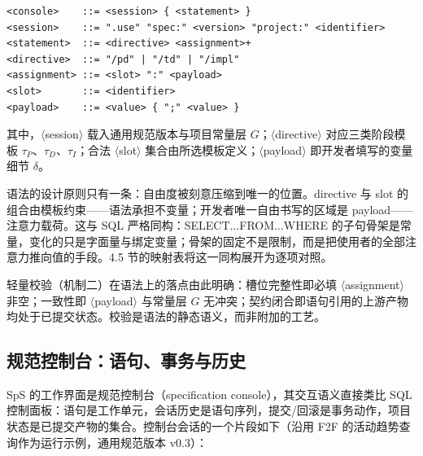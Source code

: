 \documentclass[11pt,a4paper]{ctexart}
\begin{document}
\begin{table}[htbp]
\centering
\caption{规范语句的参考语法（EBNF，非规范性）}
\label{tab:grammar}
\begin{verbatim}
<console>    ::= <session> { <statement> }
<session>    ::= ".use" "spec:" <version> "project:" <identifier>
<statement>  ::= <directive> <assignment>+
<directive>  ::= "/pd" | "/td" | "/impl"
<assignment> ::= <slot> ":" <payload>
<slot>       ::= <identifier>
<payload>    ::= <value> { ";" <value> }
\end{verbatim}
\end{table}

其中，$\langle$session$\rangle$ 载入通用规范版本与项目常量层 $G$；$\langle$directive$\rangle$ 对应三类阶段模板 $\tau_P$、$\tau_D$、$\tau_I$；合法 $\langle$slot$\rangle$ 集合由所选模板定义；$\langle$payload$\rangle$ 即开发者填写的变量细节 $\delta$。

语法的设计原则只有一条：自由度被刻意压缩到唯一的位置。directive 与 slot 的组合由模板约束——语法承担不变量；开发者唯一自由书写的区域是 payload——注意力载荷。这与 SQL 严格同构：SELECT$\ldots$FROM$\ldots$WHERE 的子句骨架是常量，变化的只是字面量与绑定变量；骨架的固定不是限制，而是把使用者的全部注意力推向值的手段。4.5 节的映射表将这一同构展开为逐项对照。

轻量校验（机制二）在语法上的落点由此明确：槽位完整性即必填 $\langle$assignment$\rangle$ 非空；一致性即 $\langle$payload$\rangle$ 与常量层 $G$ 无冲突；契约闭合即语句引用的上游产物均处于已提交状态。校验是语法的静态语义，而非附加的工艺。

\subsection{规范控制台：语句、事务与历史}
SpS 的工作界面是规范控制台（specification console），其交互语义直接类比 SQL 控制面板：语句是工作单元，会话历史是语句序列，提交/回滚是事务动作，项目状态是已提交产物的集合。控制台会话的一个片段如下（沿用 F2F\cite{ref20} 的活动趋势查询作为运行示例，通用规范版本 v0.3）：
\end{document}
